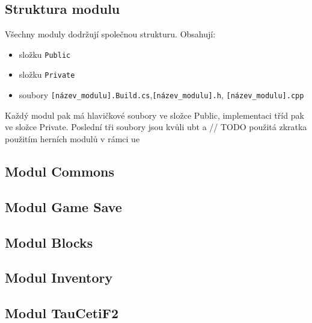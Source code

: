 \subsection{Struktura modulu}
Všechny moduly dodržují společnou strukturu. Obsahují:
\begin{itemize}
	\item složku \verb!Public!
	\item složku \verb!Private!
	\item soubory \verb![název_modulu].Build.cs!,\verb![název_modulu].h!, \verb![název_modulu].cpp!
\end{itemize}


Každý modul pak má hlavičkové soubory ve složce Public, implementaci tříd pak ve složce Private. Poslední tři soubory jsou kvůli \gls{ubt} a // TODO použitá zkratka 
použitím herních modulů v rámci \gls{ue}



\subsection{Modul Commons}



\subsection{Modul Game Save}



\subsection{Modul Blocks}



\subsection{Modul Inventory}



\subsection{Modul TauCetiF2}




